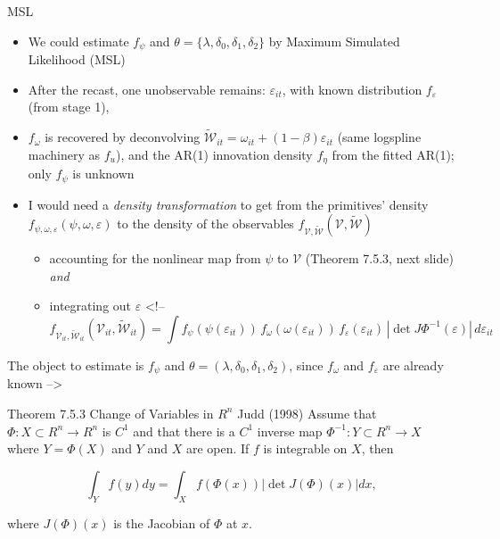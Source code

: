 \documentclass[
  ignorenonframetext,
  aspectratio=169,
]{beamer}
\providecommand{\tightlist}{%
  \setlength{\itemsep}{0pt}\setlength{\parskip}{0pt}}
\begin{document}
\begin{frame}{MSL}
\protect{}\label{msl}
\begin{itemize}
\tightlist
\item
  We could estimate \(f_\psi\) and
  \(\theta=\{\lambda,\delta_0,\delta_1,\delta_2\}\) by Maximum Simulated
  Likelihood (MSL)
\item
  After the recast, one unobservable remains: \(\varepsilon_{it}\), with
  known distribution \(f_\varepsilon\) (from stage 1),
\item
  \(f_\omega\) is recovered by deconvolving
  \(\tilde{\mathcal W}_{it}=\omega_{it}+(1-\beta)\varepsilon_{it}\)
  (same logspline machinery as \(f_u\)), and the AR(1) innovation
  density \(f_\eta\) from the fitted AR(1); only \(f_\psi\) is unknown
\item
  I would need a \emph{density transformation} to get from the
  primitives' density
  \(f_{\psi,\omega,\varepsilon}(\psi,\omega,\varepsilon)\) to the
  density of the observables
  \(f_{\mathcal V,\tilde{\mathcal W}}(\mathcal V,\tilde{\mathcal W})\)

  \begin{itemize}
  \tightlist
  \item
    accounting for the nonlinear map from \(\psi\) to \(\mathcal V\)
    (Theorem 7.5.3, next slide) \emph{and}
  \item
    integrating out \(\varepsilon\) \textless!-- \[
    f_{\mathcal V_{it},\tilde{\mathcal W}_{it}}(\mathcal V_{it},\tilde{\mathcal W}_{it})=\int f_{\psi}(\psi(\varepsilon_{it}))\,f_{\omega}(\omega(\varepsilon_{it}))\,f_\varepsilon(\varepsilon_{it})\,|\det J\Phi^{-1}(\varepsilon)|\,d\varepsilon_{it}
    \]
  \end{itemize}
\end{itemize}

The object to estimate is \(f_\psi\) and
\(\theta=(\lambda, \delta_0,\delta_1,\delta_2)\), since \(f_\omega\) and
\(f_\varepsilon\) are already known --\textgreater{}
\end{frame}

\begin{frame}{Theorem 7.5.3 Change of Variables in \(R^n\) Judd (1998)}
\protect{}\label{theorem-7.5.3-change-of-variables-in-rn-judd1998}
Assume that \(\Phi: X \subset R^n \to R^n\) is \(C^1\) and that there is
a \(C^1\) inverse map \(\Phi^{-1}: Y \subset R^n \to X\) where
\(Y=\Phi(X)\) and \(Y\) and \(X\) are open. If \(f\) is integrable on
\(X\), then

\[
\int_Y f(y)dy = \int_Xf(\Phi(x))|\det J(\Phi)(x)| dx,
\]

where \(J(\Phi)(x)\) is the Jacobian of \(\Phi\) at \(x\).
\end{frame}
\end{document}
